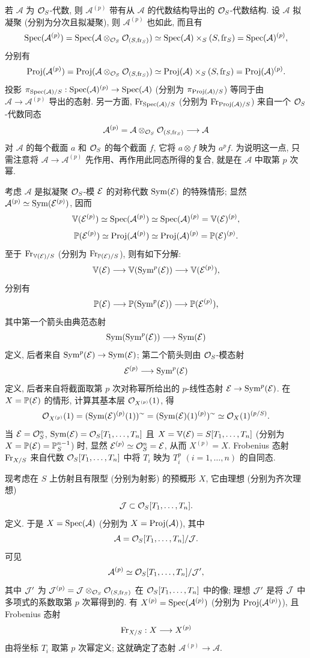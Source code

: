 若 $\mathcal{A}$ 为 $\mathcal{O}_S$-代数, 则 $\mathcal{A}^{(p)}$ 带有从 $\mathcal{A}$ 的代数结构导出的 $\mathcal{O}_S$-代数结构. 设 $\mathcal{A}$ 拟凝聚 (分别为分次且拟凝聚), 则 $\mathcal{A}^{(p)}$ 也如此, 而且有
\[
\operatorname{Spec}(\mathcal{A}^{(p)})=\operatorname{Spec}(\mathcal{A}\otimes_{\mathcal{O}_S}\mathcal{O}_{(S,\operatorname{fr}_S)})
 \simeq \operatorname{Spec}(\mathcal{A})\times_S(S,\operatorname{fr}_S)=\operatorname{Spec}(\mathcal{A})^{(p)},
\]
分别有
\[
\operatorname{Proj}(\mathcal{A}^{(p)})=\operatorname{Proj}(\mathcal{A}\otimes_{\mathcal{O}_S}\mathcal{O}_{(S,\operatorname{fr}_S)})
 \simeq \operatorname{Proj}(\mathcal{A})\times_S(S,\operatorname{fr}_S)=\operatorname{Proj}(\mathcal{A})^{(p)}.
\]
投影 $\pi_{\operatorname{Spec}(\mathcal{A})/S}:\operatorname{Spec}(\mathcal{A})^{(p)}\to\operatorname{Spec}(\mathcal{A})$ (分别为 $\pi_{\operatorname{Proj}(\mathcal{A})/S}$) 等同于由 $\mathcal{A}\to\mathcal{A}^{(p)}$ 导出的态射. 另一方面, $\operatorname{Fr}_{\operatorname{Spec}(\mathcal{A})/S}$ (分别为 $\operatorname{Fr}_{\operatorname{Proj}(\mathcal{A})/S}$) 来自一个 $\mathcal{O}_S$-代数同态
\[
\mathcal{A}^{(p)}=\mathcal{A}\otimes_{\mathcal{O}_S}\mathcal{O}_{(S,\operatorname{fr}_S)}\longrightarrow \mathcal{A}
\]
对 $\mathcal{A}$ 的每个截面 $a$ 和 $\mathcal{O}_S$ 的每个截面 $f$, 它将 $a\otimes f$ 映为 $a^p f$. 为说明这一点, 只需注意将 $\mathcal{A}\to\mathcal{A}^{(p)}$ 先作用、再作用此同态所得的复合, 就是在 $\mathcal{A}$ 中取第 $p$ 次幂.

考虑 $\mathcal{A}$ 是拟凝聚 $\mathcal{O}_S$-模 $\mathcal E$ 的对称代数 $\operatorname{Sym}(\mathcal E)$ 的特殊情形; 显然 $\mathcal{A}^{(p)}\simeq\operatorname{Sym}(\mathcal E^{(p)})$, 因而
\[
\mathbb V(\mathcal E^{(p)})\simeq\operatorname{Spec}(\mathcal{A}^{(p)})\simeq\operatorname{Spec}(\mathcal{A})^{(p)}=\mathbb V(\mathcal E)^{(p)},
\]
\[
\mathbb P(\mathcal E^{(p)})\simeq\operatorname{Proj}(\mathcal{A}^{(p)})\simeq\operatorname{Proj}(\mathcal{A})^{(p)}=\mathbb P(\mathcal E)^{(p)}.
\]
至于 $\operatorname{Fr}_{\mathbb V(\mathcal E)/S}$ (分别为 $\operatorname{Fr}_{\mathbb P(\mathcal E)/S}$), 则有如下分解:
\[
\mathbb V(\mathcal E)\longrightarrow \mathbb V(\operatorname{Sym}^p(\mathcal E))\longrightarrow \mathbb V(\mathcal E^{(p)}),
\]
分别有
\[
\mathbb P(\mathcal E)\longrightarrow \mathbb P(\operatorname{Sym}^p(\mathcal E))\longrightarrow \mathbb P(\mathcal E^{(p)}),
\]
其中第一个箭头由典范态射
\[
\operatorname{Sym}(\operatorname{Sym}^p(\mathcal E))\longrightarrow \operatorname{Sym}(\mathcal E)
\]
定义, 后者来自 $\operatorname{Sym}^p(\mathcal E)\to\operatorname{Sym}(\mathcal E)$; 第二个箭头则由 $\mathcal{O}_S$-模态射
\[
\mathcal E^{(p)}\longrightarrow \operatorname{Sym}^p(\mathcal E)
\]
定义, 后者来自将截面取第 $p$ 次对称幂所给出的 $p$-线性态射 $\mathcal E\to\operatorname{Sym}^p(\mathcal E)$. 在 $X=\mathbb P(\mathcal E)$ 的情形, 计算其基本层 $\mathcal{O}_{X^{(p)}}(1)$, 得
\[
\mathcal{O}_{X^{(p)}}(1)=(\operatorname{Sym}(\mathcal E)^{(p)}(1))^{\sim}
=(\operatorname{Sym}(\mathcal E)(1)^{(p)})^{\sim}
\simeq \mathcal{O}_X(1)^{(p/S)}.
\]
当 $\mathcal E=\mathcal{O}_S^n$, $\operatorname{Sym}(\mathcal E)=\mathcal{O}_S[T_1,\ldots,T_n]$ 且 $X=\mathbb V(\mathcal E)=S[T_1,\ldots,T_n]$ (分别为 $X=\mathbb P(\mathcal E)=\mathbb P_S^{n-1}$) 时, 显然 $\mathcal E^{(p)}\simeq\mathcal{O}_S^n=\mathcal E$, 从而 $X^{(p)}=X$. Frobenius 态射 $\operatorname{Fr}_{X/S}$ 来自代数 $\mathcal{O}_S[T_1,\ldots,T_n]$ 中将 $T_i$ 映为 $T_i^p$ $(i=1,\ldots,n)$ 的自同态.

现考虑在 $S$ 上仿射且有限型 (分别为射影) 的预概形 $X$, 它由理想 (分别为齐次理想)
\[
\mathcal J\subset \mathcal{O}_S[T_1,\ldots,T_n].
\]
定义. 于是 $X=\operatorname{Spec}(\mathcal{A})$ (分别为 $X=\operatorname{Proj}(\mathcal{A})$), 其中
\[
\mathcal{A}=\mathcal{O}_S[T_1,\ldots,T_n]/\mathcal J.
\]
可见
\[
\mathcal{A}^{(p)}
\simeq \mathcal{O}_S[T_1,\ldots,T_n]/\mathcal J',
\]
其中 $\mathcal J'$ 为
$\mathcal J^{(p)}=\mathcal J\otimes_{\mathcal{O}_S}\mathcal{O}_{(S,\operatorname{fr}_S)}$ 在 $\mathcal{O}_S[T_1,\ldots,T_n]$ 中的像; 理想 $\mathcal J'$
是将 $\mathcal J$ 中多项式的系数取第 $p$ 次幂得到的.
有 $X^{(p)}=\operatorname{Spec}(\mathcal{A}^{(p)})$ (分别为 $\operatorname{Proj}(\mathcal{A}^{(p)})$), 且 Frobenius 态射
\[
\operatorname{Fr}_{X/S}:X\longrightarrow X^{(p)}
\]
由将坐标 $T_i$ 取第 $p$ 次幂定义; 这就确定了态射 $\mathcal{A}^{(p)}\to\mathcal{A}$.


